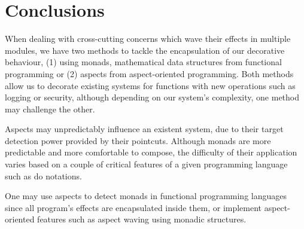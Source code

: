 \section{Conclusions}
\label{sec::conclusions}

When dealing with cross-cutting concerns which wave their effects in multiple modules, we have two methods to tackle the encapsulation of our decorative behaviour, (1) using monads, mathematical data structures from functional programming or (2) aspects from aspect-oriented programming. Both methods allow us to decorate existing systems for functions with new operations such as logging or security, although depending on our system's complexity, one method may challenge the other.

Aspects may unpredictably influence an existent system, due to their target detection power provided by their pointcuts. Although monads are more predictable and more comfortable to compose, the difficulty of their application varies based on a couple of critical features of a given programming language such as do notations. 

One may use aspects to detect monads in functional programming languages since all program's effects are encapsulated inside them, or implement aspect-oriented features such as aspect waving using monadic structures.
